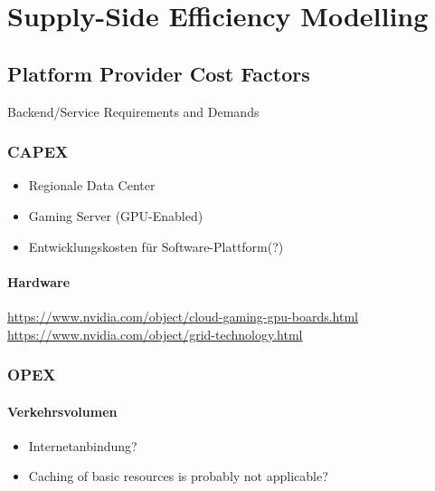 
\section{Supply-Side Efficiency Modelling} %
\label{sec:suppliermodelling}



\subsection{Platform Provider Cost Factors}
Backend/Service Requirements and Demands

\subsubsection{CAPEX}

\begin{itemize}
	\item Regionale Data Center
	\item Gaming Server (GPU-Enabled)
	\item Entwicklungskosten für Software-Plattform(?)
\end{itemize}

\paragraph{Hardware}

\url{https://www.nvidia.com/object/cloud-gaming-gpu-boards.html}
\url{https://www.nvidia.com/object/grid-technology.html}


\subsubsection{OPEX}

\paragraph{Verkehrsvolumen}

\begin{itemize}
	\item Internetanbindung?
	\item Caching of basic resources is probably not applicable?
\end{itemize}

